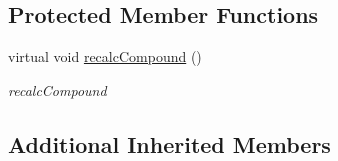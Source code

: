 \subsection*{Protected Member Functions}
\begin{DoxyCompactItemize}
\item 
virtual void \hyperlink{classcanvascv_1_1HorizontalLayout_ab6e59f3499bde32be889d3898cdf6888}{recalc\+Compound} ()
\begin{DoxyCompactList}\small\item\em recalc\+Compound \end{DoxyCompactList}\end{DoxyCompactItemize}
\subsection*{Additional Inherited Members}


